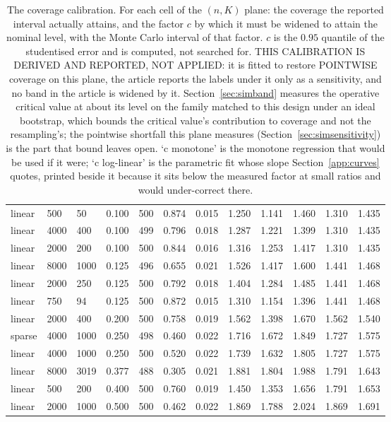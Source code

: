 \begin{table}[t]
{\begin{tabular}{lllrlrrrrrrr}
linear & 500 & 50 & 0.100 & 500 & 0.874 & 0.015 & 1.250 & 1.141 & 1.460 & 1.310 & 1.435 \\
linear & 4000 & 400 & 0.100 & 499 & 0.796 & 0.018 & 1.287 & 1.221 & 1.399 & 1.310 & 1.435 \\
linear & 2000 & 200 & 0.100 & 500 & 0.844 & 0.016 & 1.316 & 1.253 & 1.417 & 1.310 & 1.435 \\
linear & 8000 & 1000 & 0.125 & 496 & 0.655 & 0.021 & 1.526 & 1.417 & 1.600 & 1.441 & 1.468 \\
linear & 2000 & 250 & 0.125 & 500 & 0.792 & 0.018 & 1.404 & 1.284 & 1.485 & 1.441 & 1.468 \\
linear & 750 & 94 & 0.125 & 500 & 0.872 & 0.015 & 1.310 & 1.154 & 1.396 & 1.441 & 1.468 \\
linear & 2000 & 400 & 0.200 & 500 & 0.758 & 0.019 & 1.562 & 1.398 & 1.670 & 1.562 & 1.540 \\
sparse & 4000 & 1000 & 0.250 & 498 & 0.460 & 0.022 & 1.716 & 1.672 & 1.849 & 1.727 & 1.575 \\
linear & 4000 & 1000 & 0.250 & 500 & 0.520 & 0.022 & 1.739 & 1.632 & 1.805 & 1.727 & 1.575 \\
linear & 8000 & 3019 & 0.377 & 488 & 0.305 & 0.021 & 1.881 & 1.804 & 1.988 & 1.791 & 1.643 \\
linear & 500 & 200 & 0.400 & 500 & 0.760 & 0.019 & 1.450 & 1.353 & 1.656 & 1.791 & 1.653 \\
linear & 2000 & 1000 & 0.500 & 500 & 0.462 & 0.022 & 1.869 & 1.788 & 2.024 & 1.869 & 1.691 \\
\bottomrule
\end{tabular}%
}
\caption{The coverage calibration. For each cell of the $(n, K)$ plane: the coverage the reported interval actually attains, and the factor $c$ by which it must be widened to attain the nominal level, with the Monte Carlo interval of that factor. $c$ is the $0.95$ quantile of the studentised error and is computed, not searched for. THIS CALIBRATION IS DERIVED AND REPORTED, NOT APPLIED: it is fitted to restore POINTWISE coverage on this plane, the article reports the labels under it only as a sensitivity, and no band in the article is widened by it. Section~\ref{sec:simband} measures the operative critical value at about its level on the family matched to this design under an ideal bootstrap, which bounds the critical value's contribution to coverage and not the resampling's; the pointwise shortfall this plane measures (Section~\ref{sec:simsensitivity}) is the part that bound leaves open. `c monotone' is the monotone regression that would be used if it were; `c log-linear' is the parametric fit whose slope Section~\ref{app:curves} quotes, printed beside it because it sits below the measured factor at small ratios and would under-correct there.}
\label{tab:plane}
\end{table}
